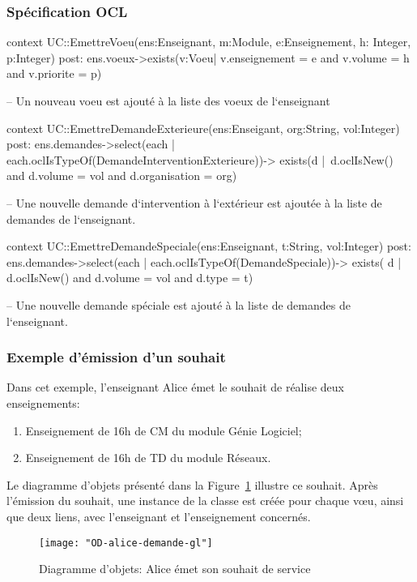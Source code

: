 \begin{ocl}
\subsubsection{Spécification OCL}
\begin{ocl}
context UC::EmettreVoeu(ens:Enseignant, m:Module, e:Enseignement, h: Integer, p:Integer)
post: 
ens.voeux->exists(v:Voeu| v.enseignement = e and v.volume = h and v.priorite = p)

-- Un nouveau voeu est ajouté à la liste des voeux de l`enseignant
\end{ocl}

\begin{ocl}
context UC::EmettreDemandeExterieure(ens:Enseigant, org:String, vol:Integer)
post: 
	ens.demandes->select(each | each.oclIsTypeOf(DemandeInterventionExterieure))->
		exists(d | d.oclIsNew() and d.volume = vol and d.organisation = org)
		
-- Une nouvelle demande d`intervention à l`extérieur est ajoutée à la liste de demandes de l`enseignant.
\end{ocl}

\begin{ocl}
context UC::EmettreDemandeSpeciale(ens:Enseignant, t:String, vol:Integer)
post:
	ens.demandes->select(each | each.oclIsTypeOf(DemandeSpeciale))->
		exists( d | d.oclIsNew() and d.volume = vol and d.type = t)

-- Une nouvelle demande spéciale est ajouté à la liste de demandes de l`enseignant.
\end{ocl}


\subsubsection{Exemple d'émission d'un souhait}
Dans cet exemple, l'enseignant Alice émet le souhait de réalise deux enseignements:
\begin{enumerate}
	\item Enseignement de 16h de CM du module Génie Logiciel;
	\item Enseignement de 16h de TD du module Réseaux.
\end{enumerate}
Le diagramme d'objets présenté dans la Figure~\ref{fig:souhait-alice} illustre ce souhait.
Après l'émission du souhait, une instance de la classe  est créée pour chaque vœu, ainsi que deux liens, avec l'enseignant et l'enseignement concernés. 

 \begin{figure}[!htbp]
 \begin{center}
 \texttt{[image: "OD-alice-demande-gl"]}
 \caption{Diagramme d'objets: Alice émet son souhait de service}
 \end{center}
 \label{fig:souhait-alice}
 \end{figure}



\end{ocl}
